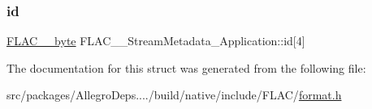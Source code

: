 \mbox{\label{struct_f_l_a_c_____stream_metadata___application_a0af01573d097b37b48b4a414318ec2ec}} 
\subsubsection{\texorpdfstring{id}{id}}
{\footnotesize\ttfamily \hyperlink{ordinals_8h_a5eb569b12d5b047cdacada4d57924ee3}{F\+L\+A\+C\+\_\+\+\_\+byte} F\+L\+A\+C\+\_\+\+\_\+\+Stream\+Metadata\+\_\+\+Application\+::id\mbox{[}4\mbox{]}}



The documentation for this struct was generated from the following file\+:\begin{DoxyCompactItemize}
\item 
src/packages/\+Allegro\+Deps..../build/native/include/\+F\+L\+A\+C/\hyperlink{format_8h}{format.\+h}\end{DoxyCompactItemize}

